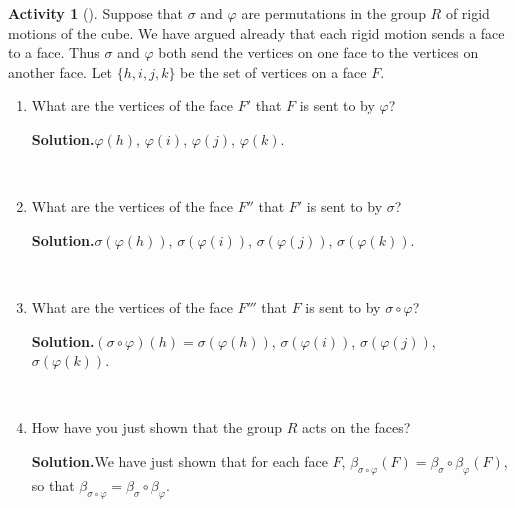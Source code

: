 \documentclass[10pt,]{book}
\theoremstyle{plain}
\theoremstyle{definition}
\newtheorem{activity}[project]{Activity}
\numberwithin{equation}{chapter}
\begin{document}
\begin{activity}[]\label{activity-279}
Suppose that \(\sigma\) and \(\varphi\) are permutations in the group \(R\) of rigid motions of the cube. We have argued already that each rigid motion sends a face to a face. Thus \(\sigma\) and \(\varphi\) both send the vertices on one face to the vertices on another face. Let \(\{h,i,j,k\}\) be the set of vertices on a face \(F\).%
~\par
\begin{enumerate}[label=(\alph*)]
 \item What are the vertices of the face \(F'\) that \(F\) is sent to by \(\varphi\)?%
\par\medskip\noindent%
\textbf{Solution.}\quad \(\varphi(h)\), \(\varphi(i)\), \(\varphi(j)\), \(\varphi(k)\).%

~\par
\item What are the vertices of the face \(F''\) that \(F'\) is sent to by \(\sigma\)?%
\par\medskip\noindent%
\textbf{Solution.}\quad \(\sigma(\varphi(h))\), \(\sigma(\varphi(i))\), \(\sigma(\varphi(j))\), \(\sigma(\varphi(k))\).%

~\par
\item What are the vertices of the face \(F'''\) that \(F\) is sent to by \(\sigma\circ\varphi\)?%
\par\medskip\noindent%
\textbf{Solution.}\quad \((\sigma\circ\varphi)(h)=\sigma(\varphi(h))\), \(\sigma(\varphi(i))\), \(\sigma(\varphi(j))\), \(\sigma(\varphi(k))\).%

~\par
\item How have you just shown that the group \(R\) acts on the faces?%
\par\medskip\noindent%
\textbf{Solution.}\quad We have just shown that for each face \(F\), \(\beta_{\sigma\circ\varphi}(F) = \beta_{\sigma} \circ \beta_{\varphi}(F)\), so that \(\beta_{\sigma\circ\varphi} = \beta_{\sigma} \circ
\beta_{\varphi}\).%

\end{enumerate}
\end{activity}
\end{document}
